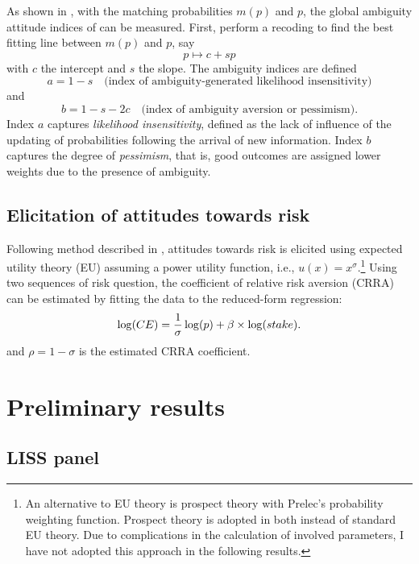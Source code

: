\documentclass[]{article}
\begin{document}
As shown in \citet{dimmock2016ambiguity}, with the matching probabilities $m(p)$ and $p$, the global ambiguity attitude indices of \citet{abdellaoui2011} can be measured. First, perform a recoding to find the best fitting line between $m(p)$ and $p$, say
\[p\mapsto c+sp \]
with $c$ the intercept and $s$ the slope. The ambiguity indices are defined
\begin{equation}
	a= 1-s\quad\text{(index of ambiguity-generated likelihood insensitivity)}
\end{equation}
and
\begin{equation}
	b = 1-s-2c\quad\text{(index of ambiguity aversion or pessimism).}
\end{equation}
Index $a$ captures \textit{likelihood insensitivity}, defined as the lack of influence of the updating of probabilities following the arrival of new information. Index $b$ captures the degree of \textit{pessimism}, that is, good outcomes are assigned lower weights due to the presence of ambiguity.

\subsection{Elicitation of attitudes towards risk}
Following method described in \citet{tanaka2010, abdellaoui2011}, attitudes towards risk is elicited using expected utility theory (EU) assuming a power utility function, i.e., $u(x)=x^\sigma$.\footnote{An alternative to EU theory is prospect theory \citep{tversky1992advances} with Prelec's \citeyearpar{prelec1998probability} probability weighting function. Prospect theory is adopted in both \citet{tanaka2010, abdellaoui2011} instead of standard EU theory. Due to complications in the calculation of involved parameters, I have not adopted this approach in the following results.} Using two sequences of risk question, the coefficient of relative risk aversion (CRRA) can be estimated by fitting the data to the reduced-form regression:
\begin{equation}
	\log(CE)={1\over \sigma}\log(p) + \beta\times \log(stake).
\end{equation}
and $\rho=1-\sigma$ is the estimated CRRA coefficient.


\section{Preliminary results}
\subsection{LISS panel}


\end{document}
